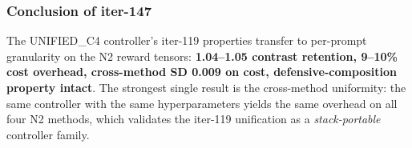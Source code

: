 \subsubsection*{Conclusion of iter-147}

The UNIFIED\_C4 controller's iter-119 properties transfer to per-prompt
granularity on the N2 reward tensors:
\textbf{1.04--1.05 contrast retention, 9--10\% cost overhead, cross-method
SD 0.009 on cost, defensive-composition property intact}.
The strongest single result is the cross-method uniformity: the same
controller with the same hyperparameters yields the same overhead on all
four N2 methods, which validates the iter-119 unification as a
\emph{stack-portable} controller family.
